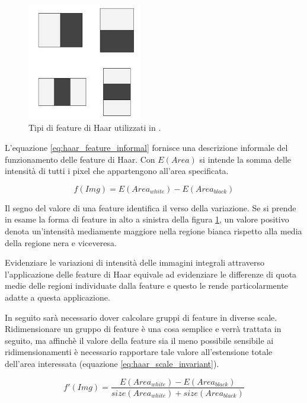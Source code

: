 \begin{figure}
    \begin{center}
        \includegraphics[width=5cm]{img/feature_types.jpg}
    \end{center}
    \caption{Tipi di feature di Haar utilizzati in \cite{Zhu13}.}
    \label{fig:features_type}
\end{figure}

L'equazione \ref{eq:haar_feature_informal} fornisce una descrizione informale del funzionamento delle feature di Haar. Con $E(Area)$ si intende la somma delle intensità di tutti i pixel che appartengono all'area specificata.

\begin{equation}
    f(Img) = E(Area_{white}) - E(Area_{black})
    \label{eq:haar_feature_informal}
\end{equation}

Il segno del valore di una feature identifica il verso della variazione. Se si prende in esame la forma di feature in alto a sinistra della figura \ref{fig:features_type}, un valore positivo denota un'intensità mediamente maggiore nella regione bianca rispetto alla media della regione nera e viceveresa.

Evidenziare le variazioni di intensità delle immagini integrali attraverso l'applicazione delle feature di Haar equivale ad evidenziare le differenze di quota medie delle regioni individuate dalla feature e questo le rende particolarmente adatte a questa applicazione.

In seguito sarà necessario dover calcolare gruppi di feature in diverse scale. Ridimensionare un gruppo di feature è una cosa semplice e verrà trattata in seguito, ma affinchè il valore della feature sia il meno possibile sensibile ai ridimensionamenti è necessario rapportare tale valore all'estensione totale dell'area interessata (equazione \ref{eq:haar_scale_invariant}).

\begin{equation}
    f'(Img) = \frac{E(Area_{white}) - E(Area_{black})}{size(Area_{white}) + size(Area_{black})}
    \label{eq:haar_scale_invariant}
\end{equation}


